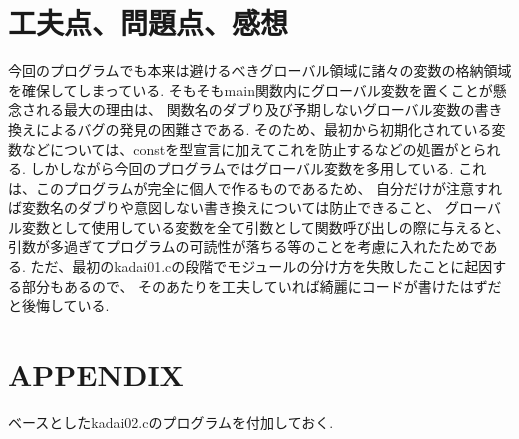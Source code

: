 \documentclass[a4j,dvipdfmx]{jsarticle}
\begin{document}
\section{工夫点、問題点、感想}
今回のプログラムでも本来は避けるべきグローバル領域に諸々の変数の格納領域を確保してしまっている.
そもそもmain関数内にグローバル変数を置くことが懸念される最大の理由は、
関数名のダブり及び予期しないグローバル変数の書き換えによるバグの発見の困難さである.
そのため、最初から初期化されている変数などについては、constを型宣言に加えてこれを防止するなどの処置がとられる.
しかしながら今回のプログラムではグローバル変数を多用している.
これは、このプログラムが完全に個人で作るものであるため、
自分だけが注意すれば変数名のダブりや意図しない書き換えについては防止できること、
グローバル変数として使用している変数を全て引数として関数呼び出しの際に与えると、
引数が多過ぎてプログラムの可読性が落ちる等のことを考慮に入れたためである.
ただ、最初のkadai01.cの段階でモジュールの分け方を失敗したことに起因する部分もあるので、
そのあたりを工夫していれば綺麗にコードが書けたはずだと後悔している.
\section{APPENDIX}
ベースとしたkadai02.cのプログラムを付加しておく.

\end{document}
